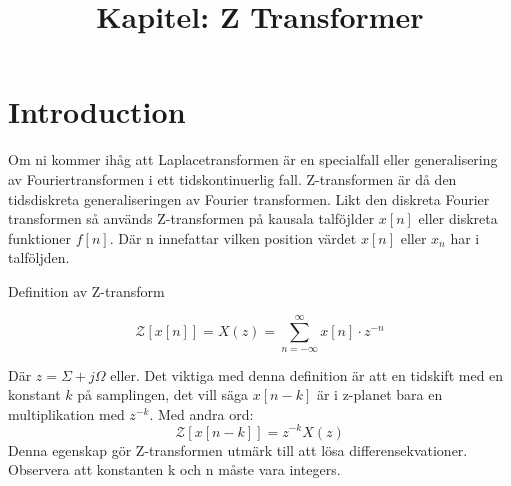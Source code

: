 \documentclass{article}
\title{Kapitel: Z Transformer}
\begin{document}
\maketitle

\section{Introduction}

Om ni kommer ihåg att Laplacetransformen är en specialfall eller generalisering av Fouriertransformen i ett
tidskontinuerlig fall. Z-transformen är då den tidsdiskreta generaliseringen av Fourier transformen.
Likt den diskreta Fourier transformen så används Z-transformen på kausala talföjlder $x[n]$ eller 
diskreta funktioner $f[n]$. Där n innefattar vilken position värdet $x[n]$ eller $x_n$ har i talföljden.

Definition av Z-transform

$$\mathcal{Z}[x[n]] = X(z) = \sum_{n=-\infty}^{\infty} x[n] \cdot z^{-n} $$

Där $z = \Sigma + j\Omega$ eller. %
Det viktiga med denna definition är att en tidskift med en konstant $k$ på samplingen, det vill säga $x[n-k]$ är i
z-planet bara en multiplikation med $z^{-k}$. Med andra ord:
$$\mathcal{Z}[x[n-k]] = z^{-k} X(z) $$ 
Denna egenskap gör Z-transformen utmärk till att lösa differensekvationer. Observera att konstanten k och n 
måste vara integers.

\appendix
\end{document}
